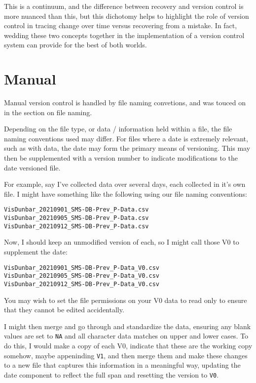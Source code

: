 \documentclass[
]{book}
\begin{document}
This is a continuum, and the difference between recovery and version control is more nuanced than this, but this dichotomy helps to highlight the role of version control in tracing change over time versus recovering from a mistake. In fact, wedding these two concepts together in the implementation of a version control system can provide for the best of both worlds.

\hypertarget{manual}{%
\section*{Manual}\label{manual}}

Manual version control is handled by file naming convetions, and was touced on in the section on file naming.

Depending on the file type, or data / information held within a file, the file naming conventions used may differ. For files where a date is extremely relevant, such as with data, the date may form the primary means of versioning. This may then be supplemented with a version number to indicate modifications to the date versioned file.

For example, say I've collected data over several days, each collected in it's own file. I might have something like the following using our file naming conventions:

\begin{verbatim}
VisDunbar_20210901_SMS-DB-Prev_P-Data.csv
VisDunbar_20210905_SMS-DB-Prev_P-Data.csv
VisDunbar_20210912_SMS-DB-Prev_P-Data.csv
\end{verbatim}

Now, I should keep an unmodified version of each, so I might call those V0 to supplement the date:

\begin{verbatim}
VisDunbar_20210901_SMS-DB-Prev_P-Data_V0.csv
VisDunbar_20210905_SMS-DB-Prev_P-Data_V0.csv
VisDunbar_20210912_SMS-DB-Prev_P-Data_V0.csv
\end{verbatim}

You may wish to set the file permissions on your V0 data to read only to ensure that they cannot be edited accidentally.

I might then merge and go through and standardize the data, ensuring any blank values are set to \texttt{NA} and all character data matches on upper and lower cases. To do this, I would make a copy of each V0, indicate that these are the working copy somehow, maybe appeninding \texttt{V1}, and then merge them and make these changes to a new file that captures this information in a meaningful way, updating the date component to reflect the full span and resetting the version to \texttt{V0}.
\end{document}
